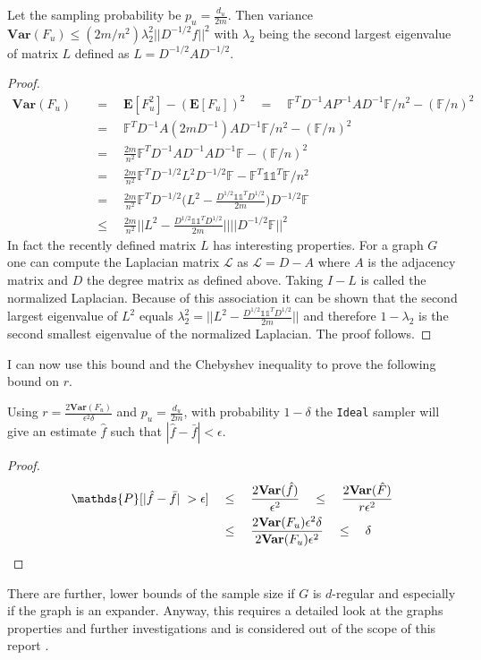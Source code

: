 \begin{lemma}
  Let the sampling probability be $p_u = \frac{d_u}{2m}$. Then variance $\textbf{Var}(F_u) \leq (2m/n^2)\lambda_2^2||D^{-1/2}f||^2$ with $\lambda_2$ being the second largest eigenvalue of matrix $L$ defined as $L = D^{-1/2}AD^{-1/2}$. 
\end{lemma}
\begin{proof}
\begin{align*}
\textbf{Var}(F_u) \quad&=\quad \textbf{E}[F_u^2] - (\textbf{E}[F_u])^2 \quad=\quad \mathds{F}^TD^{-1}AP^{-1}AD^{-1}\mathds{F}/n^2 - (\mathds{F}/n)^2 \\
&=\quad \mathds{F}^TD^{-1}A(2mD^{-1})AD^{-1}\mathds{F}/n^2 - (\mathds{F}/n)^2\\
&=\quad \frac{2m}{n^2}\mathds{F}^TD^{-1}AD^{-1}AD^{-1}\mathds{F} - (\mathds{F}/n)^2\\
&=\quad \frac{2m}{n^2}\mathds{F}^TD^{-1/2}L^2D^{-1/2}\mathds{F}-\mathds{F}^T\mathds{1}\mathds{1}^T\mathds{F}/n^2\\
&=\quad \frac{2m}{n^2}\mathds{F}^TD^{-1/2}\bigg(L^2-\frac{D^{1/2}\mathds{1}\mathds{1}^TD^{1/2}}{2m}\bigg)D^{-1/2}\mathds{F}\\
&\leq\quad \frac{2m}{n^2}\bigg|\bigg|L^2 - \frac{D^{1/2}\mathds{1}\mathds{1}^TD^{1/2}}{2m}\bigg|\bigg|||D^{-1/2}\mathds{F}||^2
\end{align*}
In fact the recently defined matrix $L$ has interesting properties. For a graph $G$ one can compute the Laplacian matrix $\mathcal{L}$ as $\mathcal{L} = D - A$ where $A$ is the adjacency matrix and $D$ the degree matrix as defined above.
Taking $I-L$ is called the normalized Laplacian. Because of this association it can be shown that the second largest eigenvalue of $L^2$ equals $\lambda_2^2 = ||L^2 - \frac{D^{1/2}\mathds{1}\mathds{1}^TD^{1/2}}{2m}||$ and therefore $1-\lambda_2$ is the second smallest eigenvalue of the normalized Laplacian. The proof follows.
\end{proof}

I can now use this bound and the Chebyshev inequality to prove the following bound on $r$.
\begin{theorem}
Using $r = \frac{2\textbf{Var}(F_u)}{\epsilon^2\delta}$ and $p_u = \frac{d_u}{2m}$, with probability $1-\delta$ the \texttt{Ideal} sampler will give an estimate $\hat{f}$ such that $|\hat{f}-\bar{f}|< \epsilon$.  
\end{theorem}
\begin{proof}
\begin{align*}
\mathds{P}[|\hat{f}-\bar{f}|\;>\epsilon] \quad&\leq\quad \frac{2\textbf{Var}(\hat{f})}{\epsilon^2} \quad\leq\quad \frac{2\textbf{Var}(\hat{F})}{r\epsilon^2} \\
&\leq\quad \frac{2\textbf{Var}(F_u)\epsilon^2\delta}{2\textbf{Var}(F_u)\epsilon^2} \quad\leq\quad \delta \qedhere
\end{align*}
\end{proof}
There are further, lower bounds of the sample size if $G$ is $d$-regular and especially if the graph is an expander. Anyway, this requires a detailed look at the graphs properties and further investigations and is considered out of the scope of this report \cite{alon1986eigenvalues}.
